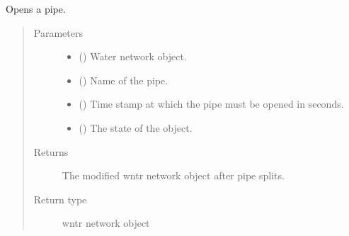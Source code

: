 \documentclass[letterpaper,10pt,english]{sphinxmanual}
\begin{document}
\begin{fulllineitems}
\label{\detokenize{apidoc:dreaminsg_integrated_model.src.network_recovery.link_open_event}}
\sphinxAtStartPar
Opens a pipe.
\begin{quote}\begin{description}
\item[{Parameters}] \leavevmode\begin{itemize}
\item {} 
\sphinxAtStartPar
{} () \textendash{} Water network object.

\item {} 
\sphinxAtStartPar
{} () \textendash{} Name of the pipe.

\item {} 
\sphinxAtStartPar
{} () \textendash{} Time stamp at which the pipe must be opened in seconds.

\item {} 
\sphinxAtStartPar
{} () \textendash{} The state of the object.

\end{itemize}

\item[{Returns}] \leavevmode
\sphinxAtStartPar
The modified wntr network object after pipe splits.

\item[{Return type}] \leavevmode
\sphinxAtStartPar
wntr network object

\end{description}\end{quote}

\end{fulllineitems}

\end{document}
